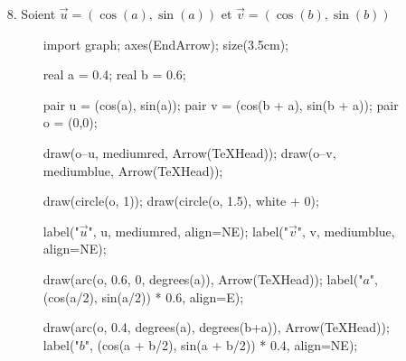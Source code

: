 \begin{prv}
	\begin{enumerate}
		\item[8.] 
			Soient $\vec{u} = (\cos(a), \sin(a))$ et $\vec{v} = (\cos(b), \sin(b))$\\
			\begin{minipage}{\linewidth}
				\begin{figure}[H]
					\centering
					\begin{asy}
						import graph;
						axes(EndArrow);
						size(3.5cm);

						real a = 0.4;
						real b = 0.6;

						pair u = (cos(a), sin(a));
						pair v = (cos(b + a), sin(b + a));
						pair o = (0,0);

						draw(o--u, mediumred, Arrow(TeXHead));
						draw(o--v, mediumblue, Arrow(TeXHead));

						draw(circle(o, 1));
						draw(circle(o, 1.5), white + 0);

						label("$\vec{u}$", u, mediumred, align=NE);
						label("$\vec{v}$", v, mediumblue, align=NE);

						draw(arc(o, 0.6, 0, degrees(a)), Arrow(TeXHead));
						label("$a$", (cos(a/2), sin(a/2)) * 0.6, align=E);

						draw(arc(o, 0.4, degrees(a), degrees(b+a)), Arrow(TeXHead));
						label("$b$", (cos(a + b/2), sin(a + b/2)) * 0.4, align=NE);


\end{asy}
\end{figure}
\end{minipage}
\end{enumerate}
\end{prv}
